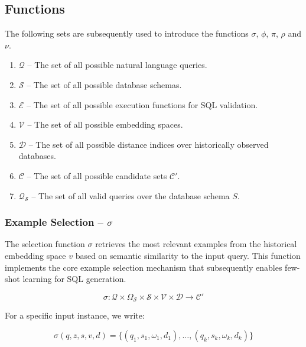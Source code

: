 \subsection{Functions}\label{design:components}

The following sets are subsequently used to introduce the functions $\sigma$, $\phi$, $\pi$, $\rho$ and $\nu$.

\begin{enumerate}
    \item $\mathcal{Q}$ – The set of all possible natural language queries.
    \item $\mathcal{S}$ – The set of all possible database schemas.
    \item $\mathcal{E}$ – The set of all possible execution functions for SQL validation.
    \item $\mathcal{V}$ – The set of all possible embedding spaces.
    \item $\mathcal{D}$ – The set of all possible distance indices over historically observed databases.
    \item $\mathcal{C}$ – The set of all possible candidate sets $\mathcal{C}'$.
    \item $\mathcal{Q}_{\mathcal{S}}$ – The set of all valid queries over the database schema $S$.
\end{enumerate}

\subsubsection{Example Selection – $\sigma$}\label{design:selection-function}

The selection function $\sigma$ retrieves the most relevant examples from the
historical embedding space $v$ based on semantic similarity to the
input query. This function implements the core example selection mechanism 
that subsequently enables few-shot learning for SQL generation.

$$
\sigma: \mathcal{Q} \times \Omega_{\mathcal{S}} \times \mathcal{S} \times \mathcal{V} \times \mathcal{D} \rightarrow \mathcal{C}'
$$

\vspace{0.5em}

For a specific input instance, we write:

$$
\sigma(q, z, s, v, d) = \{(q_1, s_1, \omega_1, d_1), \ldots, (q_k, s_k, \omega_k, d_k)\}
$$

\vspace{0.5em}


